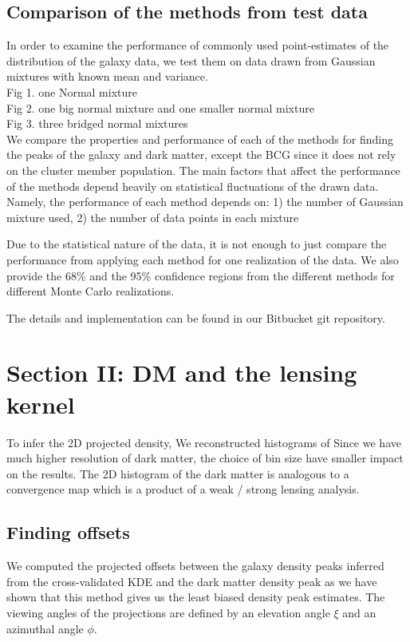 \documentclass[usenatbib]{mn2e}
\begin{document}
\subsection{Comparison of the methods from test data}
In order to examine the performance of commonly used point-estimates of the
distribution of the galaxy data, we test them on data drawn from Gaussian mixtures with
known mean and variance. \\
Fig 1. one Normal mixture \\  
Fig 2. one big normal mixture and one smaller normal mixture \\ 
Fig 3. three bridged normal mixtures \\  
We compare the properties and performance of each of the
methods for finding the peaks of the galaxy and dark matter, 
except the BCG since it does not rely on the cluster member population. 
The main factors that affect the performance of the methods depend heavily on
statistical fluctuations of the drawn data. Namely, the performance of each
method depends on: 1) the
number of Gaussian mixture used, 2) the number of data points in each mixture

Due to the statistical nature of the data, it is not enough to just
compare the performance from applying each method for one realization of the
data. We also provide the 68\% and the 95\% confidence regions from the
different methods for different Monte Carlo realizations.


The details and implementation can be found in our Bitbucket git repository.



\section{Section II: DM and the lensing kernel}
To infer the 2D projected density, We reconstructed histograms of 
Since we have much higher resolution of dark matter, the choice of bin size
have smaller impact on the results.
The 2D histogram of the dark matter is analogous to a convergence map which is
a product of a weak / strong lensing analysis. 



\subsection{Finding offsets} 
We computed the projected offsets between the galaxy density peaks inferred from the
cross-validated KDE and the dark matter density peak as we have shown that this
method gives us the least biased density peak estimates. 
The viewing angles of the projections are defined by an elevation angle
$\xi$ and an azimuthal angle $\phi$. 
\end{document}
